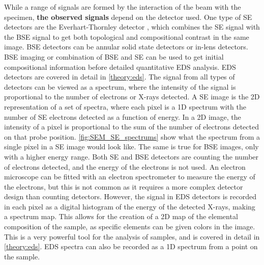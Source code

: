 While a range of signals are formed by the interaction of the beam with the specimen, \textbf{the observed signals} depend on the detector used.
One type of SE detectors are the Everhart-Thornley detector \cite{everhart_detector1960}, which combines the SE signal with the BSE signal to get both topological and compositional contrast in the same image.
BSE detectors can be annular solid state detectors or in-lens detectors.
BSE imaging or combination of BSE and SE can be used to get initial compositional information before detailed quantitative EDS analysis.
EDS detectors are covered in detail in \cref{theory:eds}.
The signal from all types of detectors can be viewed as a spectrum, where the intensity of the signal is proportional to the number of electrons or X-rays detected.
A SE image is the 2D representation of a set of spectra, where each pixel is a 1D spectrum with the number of SE electrons detected as a function of energy.
In a 2D image, the intensity of a pixel is proportional to the sum of the number of electrons detected on that probe position.
\cref{fig:SEM_SE_spectrums} show what the spectrum from a single pixel in a SE image would look like.
The same is true for BSE images, only with a higher energy range.
Both SE and BSE detectors are counting the number of electrons detected, and the energy of the electrons is not used.
An electron microscope can be fitted with an electron spectrometer to measure the energy of the electrons, but this is not common as it requires a more complex detector design than counting detectors.
However, the signal in EDS detectors is recorded in each pixel as a digital histogram of the energy of the detected X-rays, making a spectrum map.
This allows for the creation of a 2D map of the elemental composition of the sample, as specific elements can be given colors in the image.
This is a very powerful tool for the analysis of samples, and is covered in detail in \cref{theory:eds}.
EDS spectra can also be recorded as a 1D spectrum from a point on the sample.

